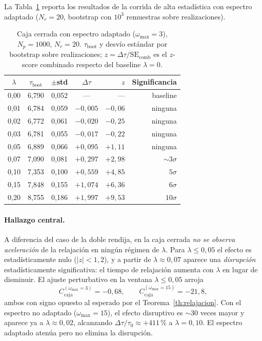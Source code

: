 \documentclass[11pt,a4paper]{article}
\begin{document}
La Tabla~\ref{tab:caja_om3} reporta los resultados de la corrida de
alta estadística con espectro adaptado ($N_r=20$, bootstrap con $10^3$
remuestras sobre realizaciones).

\begin{table}[h]
\centering
\caption{Caja cerrada con espectro adaptado ($\omega_\text{max}=3$),
$N_p=1000$, $N_r=20$. $\tau_\text{boot}$ y desvío estándar por
bootstrap sobre realizaciones; $z=\Delta\tau/\mathrm{SE}_\text{comb}$
es el $z$-score combinado respecto del baseline $\lambda=0$.}
\label{tab:caja_om3}
\begin{tabular}{ccccrr}
\toprule
$\lambda$ & $\tau_\text{boot}$ & $\pm$std & $\Delta\tau$ & $z$ & Significancia \\
\midrule
0{,}00 & 6{,}790 & 0{,}052 & ---        & ---       & baseline       \\
0{,}01 & 6{,}784 & 0{,}059 & $-0{,}005$ & $-0{,}06$ & ninguna        \\
0{,}02 & 6{,}772 & 0{,}061 & $-0{,}020$ & $-0{,}25$ & ninguna        \\
0{,}03 & 6{,}781 & 0{,}055 & $-0{,}017$ & $-0{,}22$ & ninguna        \\
0{,}05 & 6{,}889 & 0{,}066 & $+0{,}095$ & $+1{,}11$ & ninguna        \\
0{,}07 & 7{,}090 & 0{,}081 & $+0{,}297$ & $+2{,}98$ & $\sim 3\sigma$ \\
0{,}10 & 7{,}353 & 0{,}100 & $+0{,}559$ & $+4{,}85$ & $5\sigma$      \\
0{,}15 & 7{,}848 & 0{,}155 & $+1{,}074$ & $+6{,}36$ & $6\sigma$      \\
0{,}20 & 8{,}755 & 0{,}186 & $+1{,}997$ & $+9{,}53$ & $10\sigma$     \\
\bottomrule
\end{tabular}
\end{table}

\paragraph{Hallazgo central.}
A diferencia del caso de la doble rendija, en la caja cerrada \emph{no
se observa aceleración} de la relajación en ningún régimen de
$\lambda$. Para $\lambda\leq 0{,}05$ el efecto es estadísticamente nulo
($|z|<1{,}2$), y a partir de $\lambda\approx 0{,}07$ aparece una
\emph{disrupción} estadísticamente significativa: el tiempo de
relajación aumenta con $\lambda$ en lugar de disminuir. El ajuste
perturbativo en la ventana $\lambda\leq 0{,}05$ arroja
\begin{equation}
C_\text{caja}^{(\omega_\text{max}=3)}=-0{,}68,
\qquad
C_\text{caja}^{(\omega_\text{max}=15)}=-21{,}8,
\label{eq:C_caja}
\end{equation}
ambos con signo opuesto al esperado por el Teorema~\ref{th:relajacion}.
Con el espectro no adaptado ($\omega_\text{max}=15$), el efecto
disruptivo es $\sim 30$ veces mayor y aparece ya a $\lambda\approx 0{,}02$,
alcanzando $\Delta\tau/\tau_0\approx +411\,\%$ a $\lambda=0{,}10$. El
espectro adaptado atenúa pero no elimina la disrupción.
\end{document}
